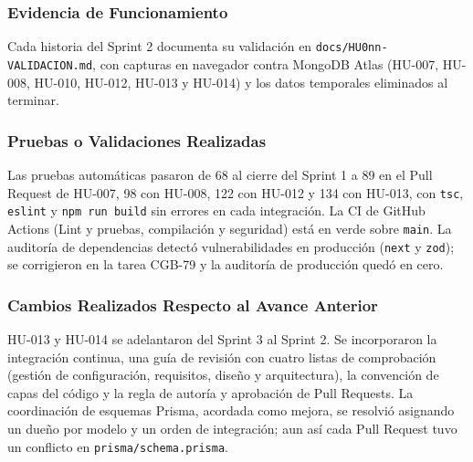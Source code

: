 \documentclass[11pt,a4paper]{article}
\begin{document}
\subsubsection{Evidencia de Funcionamiento}
Cada historia del Sprint 2 documenta su validación en \texttt{docs/HU0nn-VALIDACION.md}, con capturas en navegador contra MongoDB Atlas (HU-007, HU-008, HU-010, HU-012, HU-013 y HU-014) y los datos temporales eliminados al terminar.

\subsubsection{Pruebas o Validaciones Realizadas}
Las pruebas automáticas pasaron de 68 al cierre del Sprint 1 a 89 en el Pull Request de HU-007, 98 con HU-008, 122 con HU-012 y 134 con HU-013, con \texttt{tsc}, \texttt{eslint} y \texttt{npm run build} sin errores en cada integración. La CI de GitHub Actions (Lint y pruebas, compilación y seguridad) está en verde sobre \texttt{main}. La auditoría de dependencias detectó vulnerabilidades en producción (\texttt{next} y \texttt{zod}); se corrigieron en la tarea CGB-79 y la auditoría de producción quedó en cero.

\subsubsection{Cambios Realizados Respecto al Avance Anterior}
HU-013 y HU-014 se adelantaron del Sprint 3 al Sprint 2. Se incorporaron la integración continua, una guía de revisión con cuatro listas de comprobación (gestión de configuración, requisitos, diseño y arquitectura), la convención de capas del código y la regla de autoría y aprobación de Pull Requests. La coordinación de esquemas Prisma, acordada como mejora, se resolvió asignando un dueño por modelo y un orden de integración; aun así cada Pull Request tuvo un conflicto en \texttt{prisma/schema.prisma}.
\end{document}
